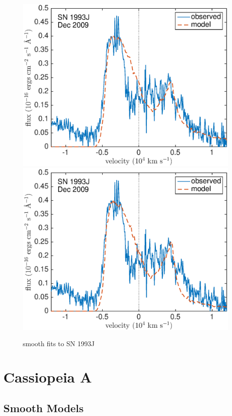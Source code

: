 \begin{figure}
\includegraphics[scale=0.4,clip=true, trim=20 0 40 20]{chapters/chapter6/figs/93J/smooth/OII}
\includegraphics[scale=0.4,clip=true, trim=20 0 40 20]{chapters/chapter6/figs/93J/smooth/OII_amC}
\caption{smooth fits to SN 1993J}
\label{93J_smooth}
\end{figure}

\section{Cassiopeia A}

\subsection{Smooth Models}

